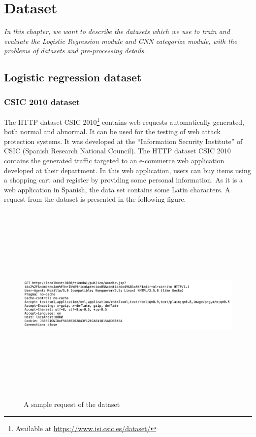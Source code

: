 \chapter{Dataset}
\label{chap:dataset}
	\textit{\hspace{0.5cm}In this chapter, we want to describe the datasets which we use to train and evaluate the Logistic Regression module and CNN categorize module, with the problems of datasets and pre-processing details.}
\minitoc
\section{Logistic regression dataset}
\label{sec:logistic_dataset}
\subsection{CSIC 2010 dataset}
\hspace{0.5cm}The HTTP dataset CSIC 2010\footnote{Available at \url{https://www.isi.csic.es/dataset/}} contains web requests automatically generated, both normal and abnormal. It can be used for the testing of web attack protection systems. It was developed at the ``Information Security Institute'' of CSIC (Spanish Research National Council). The HTTP dataset CSIC 2010 contains the generated traffic targeted to an e-commerce web application developed at their department. In this web application, users can buy items using a shopping cart and register by providing some personal information. As it is a web application in Spanish, the data set contains some Latin characters. A request from the dataset is presented in the following figure.

\begin{figure}[!h]
	\centering
	\includegraphics[width=\linewidth, height=10cm,keepaspectratio]{figures/dataset1.png}
  \caption{A sample request of the dataset}
\end{figure} 

